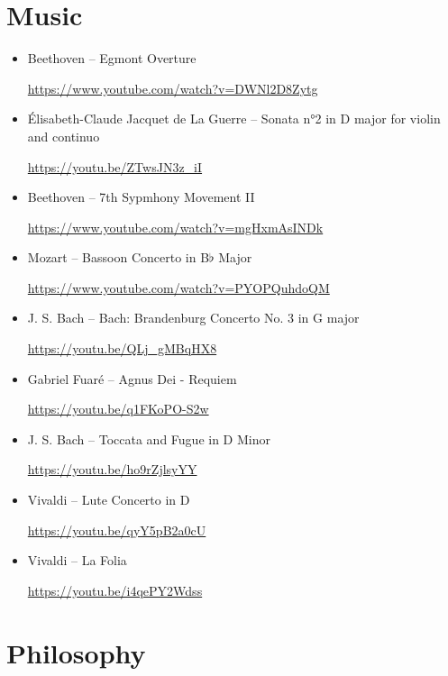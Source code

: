 \documentclass[12pt, openany, letterpaper]{memoir}
\begin{document}
\chapter{Music}
\begin{itemize}
	\item Beethoven --  Egmont Overture
	
	\hyperref[https://www.youtube.com/watch?v=DWNl2D8Zytg]{https://www.youtube.com/watch?v=DWNl2D8Zytg}
	
	\item Élisabeth-Claude Jacquet de La Guerre -- Sonata n°2 in D major for violin and continuo
	
	\hyperref[https://youtu.be/ZTwsJN3z_iI]{https://youtu.be/ZTwsJN3z\_iI}
	
	\item Beethoven --  7th Sypmhony Movement II
	
	\hyperref[https://www.youtube.com/watch?v=mgHxmAsINDk]{https://www.youtube.com/watch?v=mgHxmAsINDk}
	
	\item Mozart --  Bassoon Concerto in B$\flat$ Major
	
	\hyperref[https://www.youtube.com/watch?v=PYOPQuhdoQM]{https://www.youtube.com/watch?v=PYOPQuhdoQM}
	
	\item J. S. Bach -- Bach: Brandenburg Concerto No. 3 in G major
	
	\hyperref[https://youtu.be/QLj_gMBqHX8]{https://youtu.be/QLj\_gMBqHX8}
	
	\item Gabriel Fuar\'e -- Agnus Dei - Requiem
	
	\hyperref[https://youtu.be/q1FKoPO-S2w]{https://youtu.be/q1FKoPO-S2w}
	
	\item J. S. Bach -- Toccata and Fugue in D Minor
	
	\hyperref[https://youtu.be/ho9rZjlsyYY]{https://youtu.be/ho9rZjlsyYY}
	
	\item Vivaldi -- Lute Concerto in D
	
	\hyperref[https://youtu.be/qyY5pB2a0cU]{https://youtu.be/qyY5pB2a0cU}
	
	\item Vivaldi -- La Folia
	
	\hyperref[https://youtu.be/i4qePY2Wdss]{https://youtu.be/i4qePY2Wdss}
\end{itemize}

\chapter{Philosophy}
\end{document}

